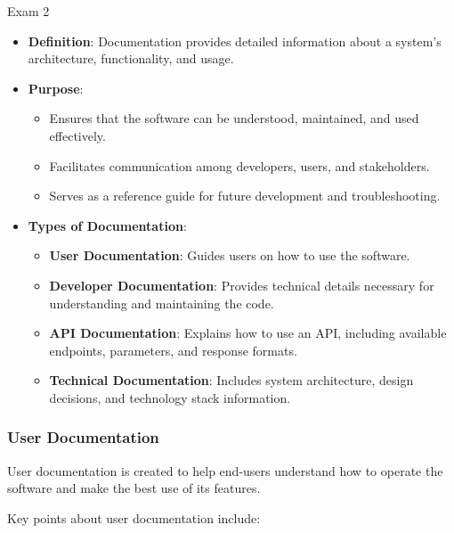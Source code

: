 \begin{examnotes}{Exam 2}
\begin{highlight}
        \begin{itemize}
            \item \textbf{Definition}: Documentation provides detailed information about a system's architecture, functionality, and usage.
            \item \textbf{Purpose}:
                \begin{itemize}
                    \item Ensures that the software can be understood, maintained, and used effectively.
                    \item Facilitates communication among developers, users, and stakeholders.
                    \item Serves as a reference guide for future development and troubleshooting.
                \end{itemize}
            \item \textbf{Types of Documentation}:
                \begin{itemize}
                    \item \textbf{User Documentation}: Guides users on how to use the software.
                    \item \textbf{Developer Documentation}: Provides technical details necessary for understanding and maintaining the code.
                    \item \textbf{API Documentation}: Explains how to use an API, including available endpoints, parameters, and response formats.
                    \item \textbf{Technical Documentation}: Includes system architecture, design decisions, and technology stack information.
                \end{itemize}
        \end{itemize}
    \end{highlight}
    
    \subsubsection*{User Documentation}
    
    User documentation is created to help end-users understand how to operate the software and make the best use of its features.
    
    \begin{highlight}
        Key points about user documentation include:
        

\end{highlight}
\end{examnotes}
